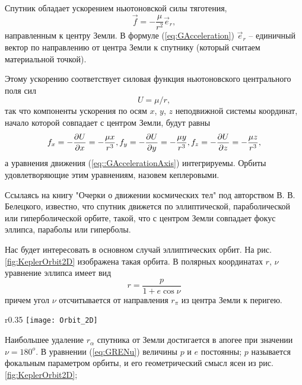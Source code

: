 Спутник обладает ускорением ньютоновской силы тяготения,
\begin{equation}  \label{eq:GAcceleration}
  \vec{f} = - \frac{\mu}{r^2}\vec{e}_r,
\end{equation}
направленным к центру Земли. В формуле (\ref{eq:GAcceleration}) $\vec{e}_r$ --
единичный вектор по направлению от центра Земли к спутнику (который считаем материальной точкой).\par
Этому ускорению соответствует силовая функция ньютоновского центрального поля сил
\begin{equation}
  U = \mu/r,
\end{equation}
так что компоненты ускорения по осям $x$, $y$, $z$ неподвижной системы координат,
начало которой совпадает с центром Земли, будут равны
\begin{equation} \label{eq::GAccelerationAxis}
  f_x = -\frac{\partial U}{\partial x} = - \frac{\mu x}{r^3}, \\
  f_y = -\frac{\partial U}{\partial y} = - \frac{\mu y}{r^3}, \\
  f_z = -\frac{\partial U}{\partial z} = - \frac{\mu z}{r^3},
\end{equation}
а уравнения движения (\ref{eq::GAccelerationAxis}) интегрируемы. Орбиты удовлетворяющие
этим уравнениям, назовем кеплеровыми.\par
Ссылаясь на книгу "Очерки о движении космических тел" под авторством В. В. Белецкого,
известно, что спутник движется по эллиптической, параболической или гиперболической орбите,
такой, что с центром Земли совпадает фокус эллипса, параболы или гиперболы.\par
Нас будет интересовать в основном случай эллиптических орбит. На рис. \ref{fig:KeplerOrbit2D}
изображена такая орбита. В полярных координатах $r$, $\nu$ уравнение эллипса имеет вид
\begin{equation} \label{eq:GRENu}
  r = \frac{p}{1 + e\cos\nu}
\end{equation}
причем угол $\nu$ отсчитывается от направления $r_{\pi}$ из центра Земли к перигею.
\begin{wrapfigure}{r}{0.35\textwidth}
  \centering
  \texttt{[image: Orbit\_2D]}
  \caption{Кеплеровская эллиптическая орбита}
  \label{fig:KeplerOrbit2D}
\end{wrapfigure}
Наибольшее удаление $r_{\alpha}$ спутника от Земли достигается в апогее при значении
$\nu = 180^{o}$. В уравнении (\ref{eq:GRENu}) величины $p$ и $e$ постоянны; $p$ называется
фокальным параметром орбиты, и его геометрический смысл ясен из рис. \ref{fig:KeplerOrbit2D};
